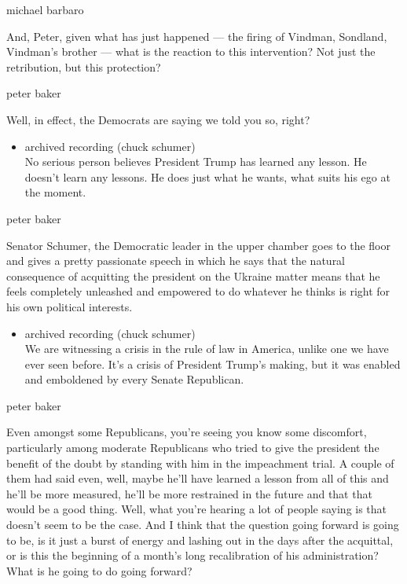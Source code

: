 michael barbaro

And, Peter, given what has just happened --- the firing of Vindman,
Sondland, Vindman's brother --- what is the reaction to this
intervention? Not just the retribution, but this protection?

peter baker

Well, in effect, the Democrats are saying we told you so, right?

\begin{itemize}
\tightlist
\item
  archived recording (chuck schumer)\\
  No serious person believes President Trump has learned any lesson. He
  doesn't learn any lessons. He does just what he wants, what suits his
  ego at the moment.
\end{itemize}

peter baker

Senator Schumer, the Democratic leader in the upper chamber goes to the
floor and gives a pretty passionate speech in which he says that the
natural consequence of acquitting the president on the Ukraine matter
means that he feels completely unleashed and empowered to do whatever he
thinks is right for his own political interests.

\begin{itemize}
\tightlist
\item
  archived recording (chuck schumer)\\
  We are witnessing a crisis in the rule of law in America, unlike one
  we have ever seen before. It's a crisis of President Trump's making,
  but it was enabled and emboldened by every Senate Republican.
\end{itemize}

peter baker

Even amongst some Republicans, you're seeing you know some discomfort,
particularly among moderate Republicans who tried to give the president
the benefit of the doubt by standing with him in the impeachment trial.
A couple of them had said even, well, maybe he'll have learned a lesson
from all of this and he'll be more measured, he'll be more restrained in
the future and that that would be a good thing. Well, what you're
hearing a lot of people saying is that doesn't seem to be the case. And
I think that the question going forward is going to be, is it just a
burst of energy and lashing out in the days after the acquittal, or is
this the beginning of a month's long recalibration of his
administration? What is he going to do going forward?

